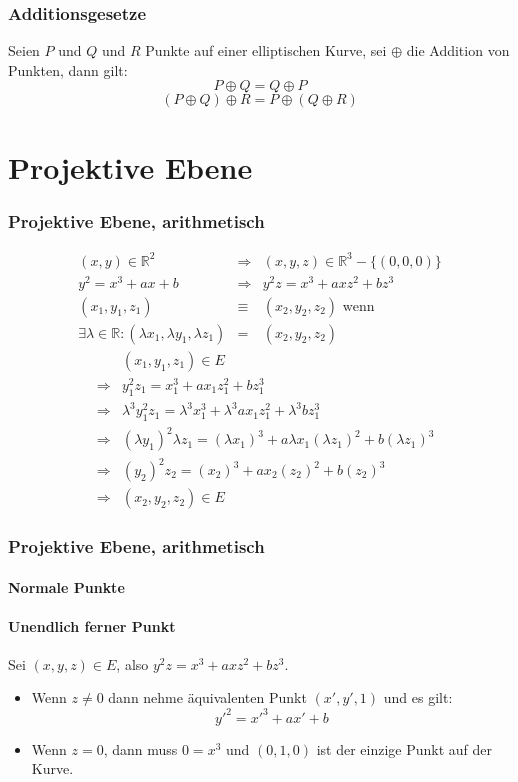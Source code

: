 \documentclass{beamer}
\newcommand{\R}{\mathbb{R}}
\begin{document}
\begin{frame}
  \frametitle{Additionsgesetze}
  Seien $P$ und $Q$ und $R$ Punkte auf einer elliptischen Kurve, sei $\oplus$
  die Addition von Punkten, dann gilt:
  \begin{equation}
    P \oplus Q = Q \oplus P
  \end{equation}
  \begin{equation}
    (P \oplus Q) \oplus R = P \oplus (Q \oplus R)
  \end{equation}
\end{frame}


\section{Projektive Ebene}

\begin{frame}
  \frametitle{Projektive Ebene, arithmetisch}
  \begin{eqnarray*}
    (x,y) \in \R^2
    & \Rightarrow & (x, y, z) \in \R^3 - \{(0,0,0)\} \\
    y^2 = x^3 + ax + b
    & \Rightarrow & y^2z = x^3 + axz^2 + bz^3 \\
    (x_1, y_1, z_1) &\equiv &(x_2, y_2, z_2) \text{ wenn } \\
    \exists \lambda \in \R:
    (\lambda x_1, \lambda y_1, \lambda z_1) & = & (x_2, y_2, z_2)
  \end{eqnarray*}
  \begin{eqnarray*}
     & & (x_1, y_1, z_1) \in E \\
     & \Rightarrow &
    y_1^2 z_1 = x_1^3 + a x_1 z_1^2 + b z_1^3 \\
    & \Rightarrow &
    \lambda^3 y_1^2 z_1
    = \lambda^3 x_1^3 + \lambda^3 a x_1 z_1^2 + \lambda^3 b z_1^3 \\
    & \Rightarrow &
    (\lambda y_1)^2 \lambda z_1 = (\lambda x_1)^3
    + a \lambda x_1 (\lambda z_1)^2 + b (\lambda z_1)^3 \\
    & \Rightarrow &
    (y_2)^2 z_2 = (x_2)^3
    + a x_2 (z_2)^2 + b (z_2)^3 \\
    & \Rightarrow & (x_2, y_2, z_2) \in E
  \end{eqnarray*}
\end{frame}

\begin{frame}
  \frametitle{Projektive Ebene, arithmetisch}
  \framesubtitle<1>{Normale Punkte}
  \framesubtitle<2>{Unendlich ferner Punkt}
  Sei $(x, y, z) \in E$, also $y^2z = x^3 + axz^2 + bz^3$.
  \begin{itemize}
  \item<1-> Wenn $z \ne 0$ dann nehme äquivalenten
    Punkt $(x', y', 1)$ und es gilt:
  \begin{equation*}
    {y'}^2 = {x'}^3 + ax' + b
  \end{equation*}
  \item<2> Wenn $z = 0$, dann muss $0 = x^3$ und $(0, 1, 0)$ ist der einzige
    Punkt auf der Kurve.
  \end{itemize}
\end{frame}
\end{document}
